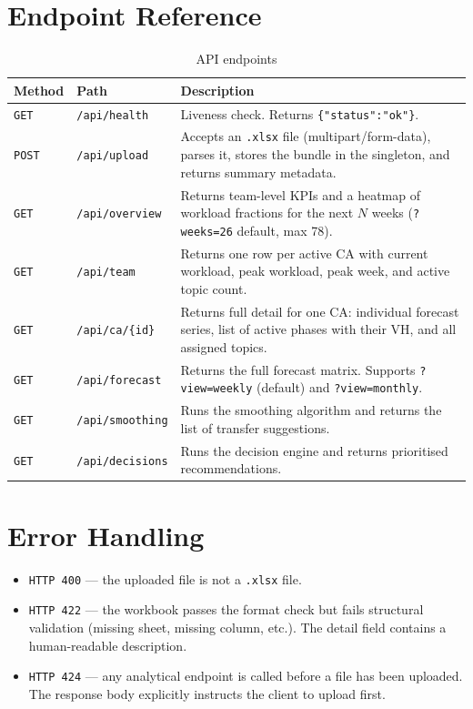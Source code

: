 \documentclass[12pt,a4paper]{report}
\begin{document}
\section{Endpoint Reference}

\begin{table}[H]
\centering
\caption{API endpoints}
\begin{tabularx}{\linewidth}{@{} l l X @{}}
\toprule
\textbf{Method} & \textbf{Path} & \textbf{Description} \\
\midrule
\texttt{GET}  & \texttt{/api/health}    &
  Liveness check. Returns \texttt{\{"status":"ok"\}}. \\[4pt]
\texttt{POST} & \texttt{/api/upload}    &
  Accepts an \texttt{.xlsx} file (multipart/form-data), parses it,
  stores the bundle in the singleton, and returns summary metadata. \\[4pt]
\texttt{GET}  & \texttt{/api/overview}  &
  Returns team-level KPIs and a heatmap of workload fractions for
  the next $N$ weeks (\texttt{?weeks=26} default, max 78). \\[4pt]
\texttt{GET}  & \texttt{/api/team}      &
  Returns one row per active CA with current workload, peak workload,
  peak week, and active topic count. \\[4pt]
\texttt{GET}  & \texttt{/api/ca/\{id\}} &
  Returns full detail for one CA: individual forecast series, list
  of active phases with their VH, and all assigned topics. \\[4pt]
\texttt{GET}  & \texttt{/api/forecast}  &
  Returns the full forecast matrix. Supports \texttt{?view=weekly}
  (default) and \texttt{?view=monthly}. \\[4pt]
\texttt{GET}  & \texttt{/api/smoothing} &
  Runs the smoothing algorithm and returns the list of transfer
  suggestions. \\[4pt]
\texttt{GET}  & \texttt{/api/decisions} &
  Runs the decision engine and returns prioritised recommendations. \\
\bottomrule
\end{tabularx}
\end{table}

\section{Error Handling}

\begin{itemize}
  \item \texttt{HTTP 400} --- the uploaded file is not a \texttt{.xlsx} file.
  \item \texttt{HTTP 422} --- the workbook passes the format check but
        fails structural validation (missing sheet, missing column, etc.).
        The detail field contains a human-readable description.
  \item \texttt{HTTP 424} --- any analytical endpoint is called before a
        file has been uploaded. The response body explicitly instructs
        the client to upload first.
\end{itemize}
\end{document}

